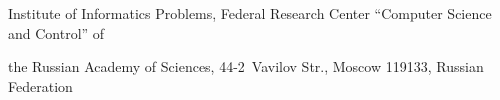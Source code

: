 \titel{\tit}{\aut}{\autkol}{\titkol}





\vspace*{-11pt}








\noindent


  Institute of Informatics Problems, Federal Research Center ``Computer Science and Control'' of 


the Russian Academy of Sciences, 44-2~Vavilov Str., Moscow 119133, Russian Federation








\def\leftfootline{\small{\textbf{\thepage}


\hfill Sistemy i Sredstva Informatiki~---


Systems and Means of Informatics 2020 vol~30 no\,1}


}%


 \def\rightfootline{\small{Sistemy i Sredstva Informatiki~---


 Systems and Means of Informatics   2020   vol~30   no\,1


\hfill \textbf{\thepage}}}





\vspace*{3pt}


     


     


       


